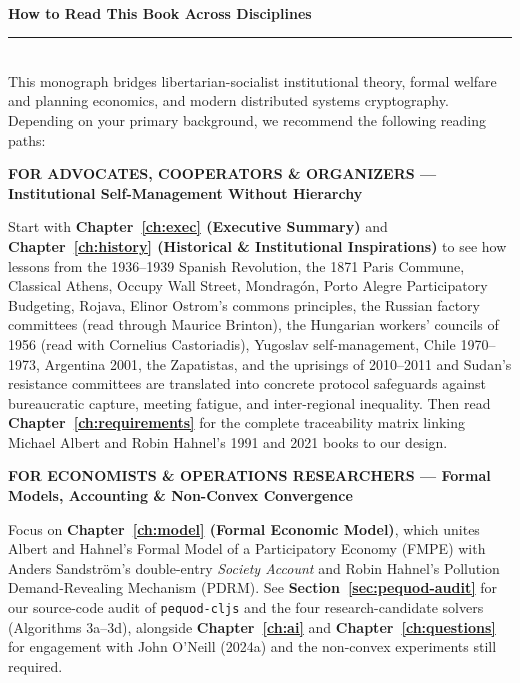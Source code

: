 \documentclass[10pt,twoside,openany]{book}
\theoremstyle{dpepstyle}
\newcommand{\audiencebox}[3]{%
  \par\smallskip\noindent
  \colorbox{SoftBg}{%
    \parbox{\dimexpr\textwidth-2\fboxsep\relax}{%
      \vspace{5pt}
      {\footnotesize\textbf{\textcolor{CrimsonAccent}{\MakeUppercase{#1}} --- \textcolor{NavyPrimary}{#2}}}\par\vspace{3pt}
      {\small #3}
      \vspace{5pt}
    }%
  }\par\smallskip
}
\begin{document}
\thispagestyle{empty}
\noindent{\footnotesize\scshape\bfseries\textcolor{CrimsonAccent}{Interdisciplinary Navigation Guide}}\\[0.3em]
{\Large\bfseries\color{NavyPrimary} How to Read This Book Across Disciplines}\\[0.4em]
\rule{\textwidth}{0.6pt}\\[0.6em]
{\small\color{SlateDark} This monograph bridges libertarian-socialist institutional theory, formal welfare and planning economics, and modern distributed systems cryptography. Depending on your primary background, we recommend the following reading paths:}\\[0.6em]

\audiencebox{For Advocates, Cooperators \& Organizers}{Institutional Self-Management Without Hierarchy}{
Start with \textbf{Chapter~\ref{ch:exec} (Executive Summary)} and \textbf{Chapter~\ref{ch:history} (Historical \& Institutional Inspirations)} to see how lessons from the 1936--1939 Spanish Revolution, the 1871 Paris Commune, Classical Athens, Occupy Wall Street, Mondrag\'on, Porto Alegre Participatory Budgeting, Rojava, Elinor Ostrom's commons principles, the Russian factory committees (read through Maurice Brinton), the Hungarian workers' councils of 1956 (read with Cornelius Castoriadis), Yugoslav self-management, Chile 1970--1973, Argentina 2001, the Zapatistas, and the uprisings of 2010--2011 and Sudan's resistance committees are translated into concrete protocol safeguards against bureaucratic capture, meeting fatigue, and inter-regional inequality. Then read \textbf{Chapter~\ref{ch:requirements}} for the complete traceability matrix linking Michael Albert and Robin Hahnel's 1991 and 2021 books to our design.}

\vspace{4pt}
\audiencebox{For Economists \& Operations Researchers}{Formal Models, Accounting \& Non-Convex Convergence}{
Focus on \textbf{Chapter~\ref{ch:model} (Formal Economic Model)}, which unites Albert and Hahnel's Formal Model of a Participatory Economy (FMPE) with Anders Sandstr\"om's double-entry \emph{Society Account} and Robin Hahnel's Pollution Demand-Revealing Mechanism (PDRM). See \textbf{Section~\ref{sec:pequod-audit}} for our source-code audit of \texttt{pequod-cljs} and the four research-candidate solvers (Algorithms 3a--3d), alongside \textbf{Chapter~\ref{ch:ai}} and \textbf{Chapter~\ref{ch:questions}} for engagement with John O'Neill (2024a) and the non-convex experiments still required.}
\end{document}
